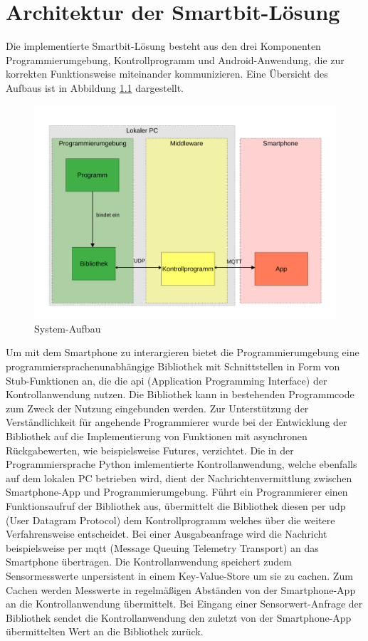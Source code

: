 \documentclass[11pt,a4paper]{report}
\begin{document}
\chapter{Architektur der Smartbit-Lösung} \label{chap:architektur}
Die implementierte Smartbit-Lösung besteht aus den drei Komponenten Programmierumgebung, Kontrollprogramm und Android-Anwendung, die zur korrekten Funktionsweise miteinander kommunizieren.
Eine Übersicht des Aufbaus ist in Abbildung \ref{fig:design} dargestellt.
\begin{figure}[htbp]
\centering
\includegraphics[width=\textwidth]{images/framework.pdf}
\caption{System-Aufbau}
\label{fig:design}
\end{figure}
Um mit dem Smartphone zu interargieren bietet die Programmierumgebung eine programmiersprachenunabhängige Bibliothek mit Schnittstellen in Form von Stub-Funktionen an, die die \acrshort{api} (Application Programming Interface) der Kontrollanwendung nutzen.
Die Bibliothek kann in bestehenden Programmcode zum Zweck der Nutzung eingebunden werden.
Zur Unterstützung der Verständlichkeit für angehende Programmierer wurde bei der Entwicklung der Bibliothek auf die Implementierung von Funktionen mit asynchronen Rückgabewerten, wie beispielsweise Futures, verzichtet.
Die in der Programmiersprache Python imlementierte Kontrollanwendung, welche ebenfalls auf dem lokalen PC betrieben wird, dient der Nachrichtenvermittlung zwischen Smartphone-App und Programmierumgebung.
Führt ein Programmierer einen Funktionsaufruf der Bibliothek aus, übermittelt die Bibliothek diesen per \acrshort{udp} (User Datagram Protocol) dem Kontrollprogramm welches über die weitere Verfahrensweise entscheidet.
Bei einer Ausgabeanfrage wird die Nachricht beispielsweise per \acrshort{mqtt} (Message Queuing Telemetry Transport) an das Smartphone übertragen.
Die Kontrollanwendung speichert zudem Sensormesswerte unpersistent in einem Key-Value-Store um sie zu cachen.
Zum Cachen werden Messwerte in regelmäßigen Abständen von der Smartphone-App an die Kontrollanwendung übermittelt.
Bei Eingang einer Sensorwert-Anfrage der Bibliothek sendet die Kontrollanwendung den zuletzt von der Smartphone-App übermittelten Wert an die Bibliothek zurück.
\end{document}
